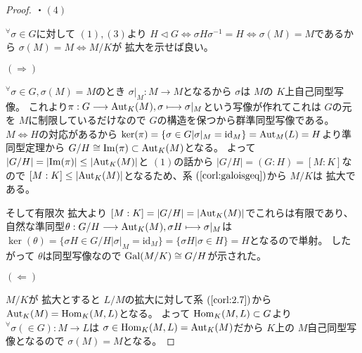 \documentclass[../master_galois_theory]{subfiles}
\begin{document}
\begin{proof}
  ・$(4)$

  ${}^\forall \sigma \in G$に対して $(1) , (3)$より $H \lhd G \Leftrightarrow \sigma H \sigma^{-1} = H \Leftrightarrow \sigma(M) = M$であるから
  $\sigma(M) = M \Leftrightarrow M/K$が \galois 拡大を示せば良い。

  $(\Rightarrow)$

  ${}^\forall \sigma \in G , \sigma(M) = M$のとき $\sigma|_M : M \longrightarrow M$となるから $\sigma$は $M$の $K$上自己同型写像。
  これより$\pi : G \longrightarrow \mathrm{Aut}_K(M) , \sigma \longmapsto \sigma|_M$という写像が作れてこれは $G$の元を $M$に制限しているだけなので $G$の構造を保つから群準同型写像である。
  $M \Leftrightarrow H$の対応があるから $\ker(\pi) = \{ \sigma \in G | \sigma|_M = \mathrm{id}_M \} = \mathrm{Aut}_M(L) = H$より準同型定理から
  $G/H \cong \mathrm{Im}(\pi) \subset \mathrm{Aut}_K(M)$となる。
  よって $|G/H| = |\mathrm{Im}(\pi)| \leq |\mathrm{Aut}_K(M)|$と $(1)$の話から $|G/H| = (G:H) = [M:K]$なので $[M:K] \leq |\mathrm{Aut}_K(M)|$となるため、系 $(\mathrm{\ref{corl:galoisgeq}})$から $M/K$は \galois 拡大である。

  そして有限次 \galois 拡大より $[M:K] = |G/H| = |\mathrm{Aut}_K(M)|$でこれらは有限であり、
  自然な準同型$\theta : G/H \longrightarrow \mathrm{Aut}_K(M) , \sigma H \longmapsto \sigma|_M$は
  $\ker(\theta) = \{ \sigma H \in G/H | \sigma|_M = \mathrm{id}_M \} = \{ \sigma H | \sigma \in H \} = H$となるので単射。
  したがって $\theta$は同型写像なので $\mathrm{Gal}(M/K) \cong G/H$が示された。

  $(\Leftarrow)$

  $M/K$が \galois 拡大とすると $L/M$の拡大に対して系 $(\mathrm{\ref{corl:2.7}})$から $\mathrm{Aut}_K(M) = \mathrm{Hom}_K(M,L)$となる。
  よって $\mathrm{Hom}_K(M,L) \subset G$より ${}^\forall \sigma (\in G) : M \longrightarrow L$は $\sigma \in \mathrm{Hom}_K(M,L) = \mathrm{Aut}_K(M)$だから
  $K$上の $M$自己同型写像となるので $\sigma(M) = M$となる。

\end{proof}

\clearpage
\end{document}
